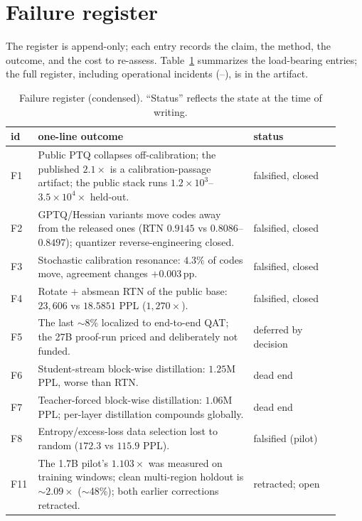 \section{Failure register}
\label{app:failures}

The register is append-only; each entry records the claim, the method, the
outcome, and the cost to re-assess. Table~\ref{tab:register} summarizes the
load-bearing entries; the full register, including operational incidents
(--), is in the artifact.

\begin{table}[t]
\caption{Failure register (condensed). ``Status'' reflects the state at the
time of writing.}
\label{tab:register}
\begin{center}
\begin{tabular}{p{0.05\linewidth}p{0.62\linewidth}p{0.25\linewidth}}
\toprule
id & one-line outcome & status \\
\midrule
F1 & Public PTQ collapses off-calibration; the published $2.1\times$ is a calibration-passage artifact; the public stack runs $1.2\times10^{3}$--$3.5\times10^{4}\times$ held-out. & falsified, closed \\
F2 & GPTQ/Hessian variants move codes away from the released ones (RTN $0.9145$ vs $0.8086$--$0.8497$); quantizer reverse-engineering closed. & falsified, closed \\
F3 & Stochastic calibration resonance: $4.3\%$ of codes move, agreement changes $+0.003$\,pp. & falsified, closed \\
F4 & Rotate $+$ absmean RTN of the public base: $23{,}606$ vs $18.5851$ PPL ($1{,}270\times$). & falsified, closed \\
F5 & The last $\sim$$8\%$ localized to end-to-end QAT; the 27B proof-run priced and deliberately not funded. & deferred by decision \\
F6 & Student-stream block-wise distillation: $1.25$M PPL, worse than RTN. & dead end \\
F7 & Teacher-forced block-wise distillation: $1.06$M PPL; per-layer distillation compounds globally. & dead end \\
F8 & Entropy/excess-loss data selection lost to random ($172.3$ vs $115.9$ PPL). & falsified (pilot) \\
F11 & The 1.7B pilot's $1.103\times$ was measured on training windows; clean multi-region holdout is $\sim$$2.09\times$ ($\sim$48\%); both earlier corrections retracted. & retracted; open \\
\bottomrule
\end{tabular}
\end{center}
\end{table}

